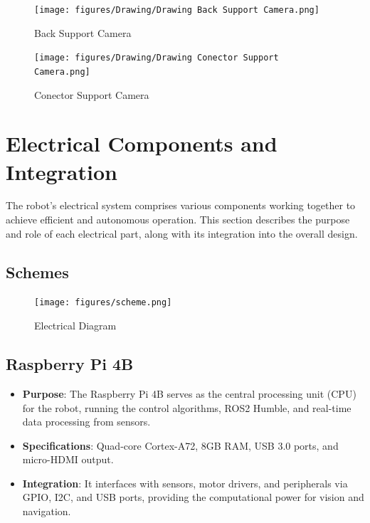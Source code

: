 \documentclass[12pt,a4paper]{article}
\begin{document}
\begin{figure}[H]
    \vspace{4cm}
    \centering
    \texttt{[image: figures/Drawing/Drawing Back Support Camera.png]}
    \caption{Back Support Camera}
\end{figure}

\begin{figure}[H]
    \vspace{4cm}
    \centering
    \texttt{[image: figures/Drawing/Drawing Conector Support Camera.png]}
    \caption{Conector Support Camera}
\end{figure}





\newpage

\section{Electrical Components and Integration}
The robot's electrical system comprises various components working together to achieve efficient and autonomous operation. This section describes the purpose and role of each electrical part, along with its integration into the overall design.


\subsection{Schemes}
\begin{figure}[H]
    \centering
    \texttt{[image: figures/scheme.png]}
    \caption{Electrical Diagram}
    \label{fig:scheme}
\end{figure}

\subsection{Raspberry Pi 4B}
\begin{itemize}
    \item \textbf{Purpose}: The Raspberry Pi 4B serves as the central processing unit (CPU) for the robot, running the control algorithms, ROS2 Humble, and real-time data processing from sensors.
    \item \textbf{Specifications}: Quad-core Cortex-A72, 8GB RAM, USB 3.0 ports, and micro-HDMI output.
    \item \textbf{Integration}: It interfaces with sensors, motor drivers, and peripherals via GPIO, I2C, and USB ports, providing the computational power for vision and navigation.
\end{itemize}
\newpage
\end{document}
